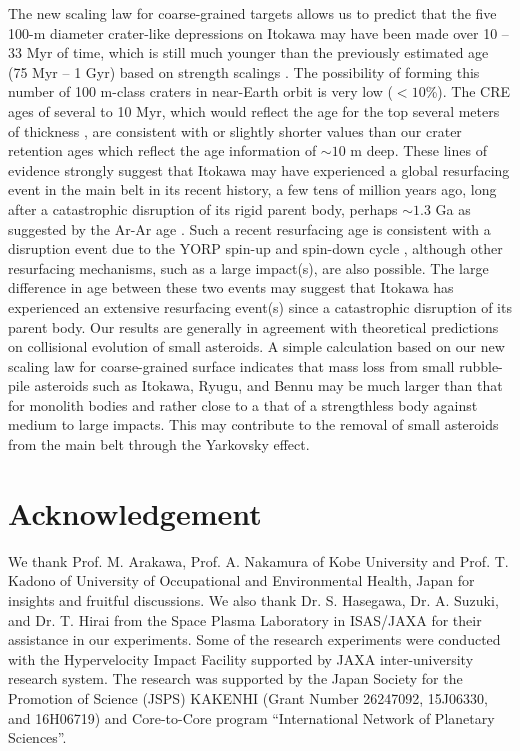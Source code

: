 \documentclass[3p,authoryear]{elsarticle}
\begin{document}
The new scaling law for coarse-grained targets allows us to predict that the five 100-m diameter crater-like depressions on Itokawa may have been made over 10 -- 33 Myr of time, which is still much younger than the previously estimated age (75 Myr -- 1 Gyr) based on strength scalings \citep{michel2009}. The possibility of forming this number of 100 m-class craters in near-Earth orbit is very low ($<10$\%). The CRE ages of several to 10 Myr, which would reflect the age for the top several meters of thickness \citep{nagao2011, meier2014, nishiizumi2015}, are consistent with or slightly shorter values than our crater retention ages which reflect the age information of $\sim 10$ m deep. These lines of evidence strongly suggest that Itokawa may have experienced a global resurfacing event in the main belt in its recent history, a few tens of million years ago, long after a catastrophic disruption of its rigid parent body, perhaps $\sim 1.3$ Ga as suggested by the Ar-Ar age \citep{park2015}. Such a recent resurfacing age is consistent with a disruption event due to the YORP spin-up and spin-down cycle \citep{scheeres2008, lowry2014}, although other resurfacing mechanisms, such as a large impact(s), are also possible. The large difference in age between these two events may suggest that Itokawa has experienced an extensive resurfacing event(s) since a catastrophic disruption of its parent body. Our results are generally in agreement with theoretical predictions on collisional evolution of small asteroids. A simple calculation based on our new scaling law for coarse-grained surface indicates that mass loss from small rubble-pile asteroids such as Itokawa, Ryugu, and Bennu may be much larger than that for monolith bodies and rather close to a that of a strengthless body against medium to large impacts. This may contribute to the removal of small asteroids from the main belt through the Yarkovsky effect.

\section*{Acknowledgement}
We thank Prof. M. Arakawa, Prof. A. Nakamura of Kobe University and Prof. T. Kadono of University of Occupational and Environmental Health, Japan for insights and fruitful discussions. We also thank Dr. S. Hasegawa, Dr. A. Suzuki, and Dr. T. Hirai from the Space Plasma Laboratory in ISAS/JAXA for their assistance in our experiments. Some of the research experiments were conducted with the Hypervelocity Impact Facility supported by JAXA inter-university research system.
The research was supported by the Japan Society for the Promotion of Science (JSPS) KAKENHI (Grant Number 26247092, 15J06330, and 16H06719) and Core-to-Core program ``International Network of Planetary Sciences''.
\end{document}
